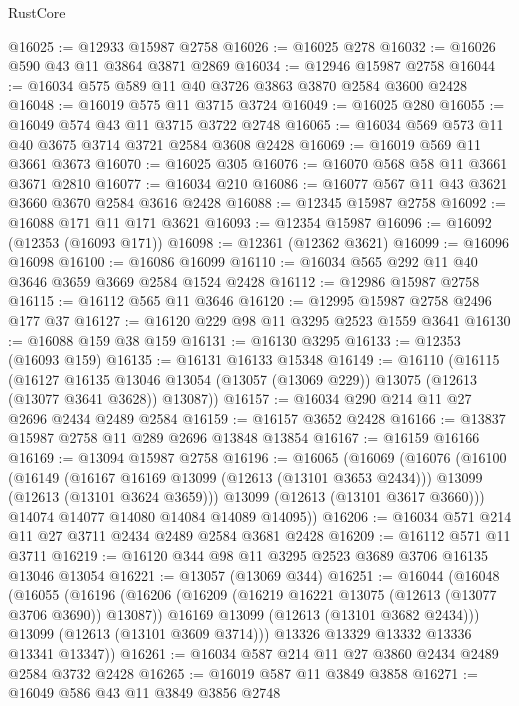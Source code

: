 \begin{lexlean}{RustCore}
\begin{coremodule}
@16025 := @12933 @15987 @2758
@16026 := @16025 @278
@16032 := @16026 @590 @43 @11 @3864 @3871 @2869
@16034 := @12946 @15987 @2758
@16044 := @16034 @575 @589 @11 @40 @3726 @3863 @3870 @2584 @3600 @2428
@16048 := @16019 @575 @11 @3715 @3724
@16049 := @16025 @280
@16055 := @16049 @574 @43 @11 @3715 @3722 @2748
@16065 := @16034 @569 @573 @11 @40 @3675 @3714 @3721 @2584 @3608 @2428
@16069 := @16019 @569 @11 @3661 @3673
@16070 := @16025 @305
@16076 := @16070 @568 @58 @11 @3661 @3671 @2810
@16077 := @16034 @210
@16086 := @16077 @567 @11 @43 @3621 @3660 @3670 @2584 @3616 @2428
@16088 := @12345 @15987 @2758
@16092 := @16088 @171 @11 @171 @3621
@16093 := @12354 @15987
@16096 := @16092 (@12353 (@16093 @171))
@16098 := @12361 (@12362 @3621)
@16099 := @16096 @16098
@16100 := @16086 @16099
@16110 := @16034 @565 @292 @11 @40 @3646 @3659 @3669 @2584 @1524 @2428
@16112 := @12986 @15987 @2758
@16115 := @16112 @565 @11 @3646
@16120 := @12995 @15987 @2758 @2496 @177 @37
@16127 := @16120 @229 @98 @11 @3295 @2523 @1559 @3641
@16130 := @16088 @159 @38 @159
@16131 := @16130 @3295
@16133 := @12353 (@16093 @159)
@16135 := @16131 @16133 @15348
@16149 := @16110
    (@16115
      (@16127
        @16135
        @13046
        @13054
        (@13057 (@13069 @229))
        @13075
        (@12613 (@13077 @3641 @3628))
        @13087))
@16157 := @16034 @290 @214 @11 @27 @2696 @2434 @2489 @2584
@16159 := @16157 @3652 @2428
@16166 := @13837 @15987 @2758 @11 @289 @2696 @13848 @13854
@16167 := @16159 @16166
@16169 := @13094 @15987 @2758
@16196 := @16065
    (@16069
      (@16076
        (@16100
          (@16149
            (@16167 @16169 @13099 (@12613 (@13101 @3653 @2434)))
            @13099
            (@12613 (@13101 @3624 @3659)))
          @13099
          (@12613 (@13101 @3617 @3660)))
        @14074
        @14077
        @14080
        @14084
        @14089
        @14095))
@16206 := @16034 @571 @214 @11 @27 @3711 @2434 @2489 @2584 @3681 @2428
@16209 := @16112 @571 @11 @3711
@16219 := @16120 @344 @98 @11 @3295 @2523 @3689 @3706 @16135 @13046 @13054
@16221 := @13057 (@13069 @344)
@16251 := @16044
    (@16048
      (@16055
        (@16196
          (@16206
            (@16209 (@16219 @16221 @13075 (@12613 (@13077 @3706 @3690)) @13087))
            @16169
            @13099
            (@12613 (@13101 @3682 @2434)))
          @13099
          (@12613 (@13101 @3609 @3714)))
        @13326
        @13329
        @13332
        @13336
        @13341
        @13347))
@16261 := @16034 @587 @214 @11 @27 @3860 @2434 @2489 @2584 @3732 @2428
@16265 := @16019 @587 @11 @3849 @3858
@16271 := @16049 @586 @43 @11 @3849 @3856 @2748

\end{coremodule}
\end{lexlean}
